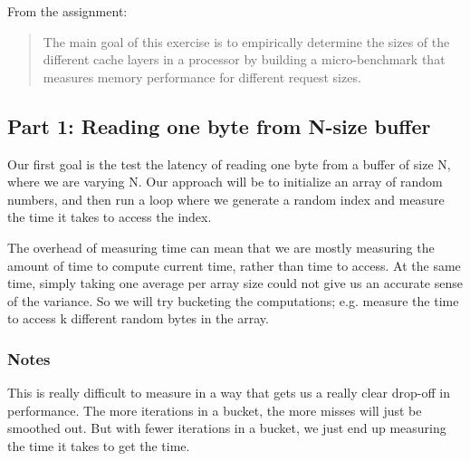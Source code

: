 From the assignment\+:

\begin{quote}
The main goal of this exercise is to empirically determine the sizes of the different cache layers in a processor by building a micro-\/benchmark that measures memory performance for different request sizes. \end{quote}


\subsection*{Part 1\+: Reading one byte from N-\/size buffer}

Our first goal is the test the latency of reading one byte from a buffer of size {\ttfamily N}, where we are varying {\ttfamily N}. Our approach will be to initialize an array of random numbers, and then run a loop where we generate a random index and measure the time it takes to access the index.

The overhead of measuring time can mean that we are mostly measuring the amount of time to compute current time, rather than time to access. At the same time, simply taking one average per array size could not give us an accurate sense of the variance. So we will try bucketing the computations; e.\+g. measure the time to access {\ttfamily k} different random bytes in the array.

\subsubsection*{Notes}

This is really difficult to measure in a way that gets us a really clear drop-\/off in performance. The more iterations in a bucket, the more misses will just be smoothed out. But with fewer iterations in a bucket, we just end up measuring the time it takes to get the time. 